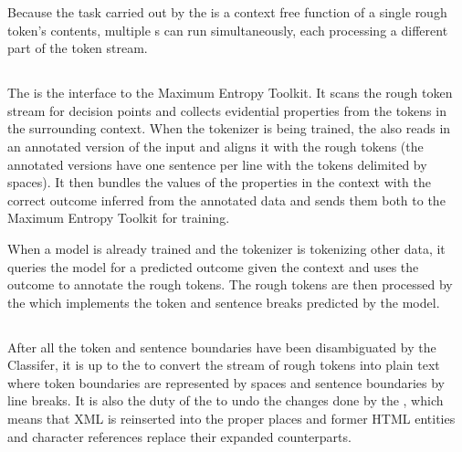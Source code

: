 Because the task carried out by the  is a context free
function of a single rough token's contents, multiple s
can run simultaneously, each processing a different part of the token stream.

\subsection{}
\label{ssec:impl-overview-classifier}

The  is the interface to the Maximum Entropy Toolkit. It
scans the rough token stream for decision points and collects evidential
properties from the tokens in the surrounding context. When the tokenizer is
being trained, the  also reads in an annotated version of the
input and aligns it with the rough tokens (the annotated versions have one
sentence per line with the tokens delimited by spaces). It then bundles the
values of the properties in the context with the correct outcome inferred from
the annotated data and sends them both to the Maximum Entropy Toolkit for
training.

When a model is already trained and the tokenizer is tokenizing other data, it
queries the model for a predicted outcome given the context and uses the
outcome to annotate the rough tokens. The rough tokens are then processed by
the  which implements the token and sentence breaks
predicted by the model.

\subsection{}
\label{ssec:impl-overview-outputformatter}

After all the token and sentence boundaries have been disambiguated by the
Classifer, it is up to the  to convert the stream of
rough tokens into plain text where token boundaries are represented by spaces
and sentence boundaries by line breaks. It is also the duty of the
 to undo the changes done by the ,
which means that XML is reinserted into the proper places and former HTML
entities and character references replace their expanded counterparts.

\subsection{}
\label{ssec:impl-overview-encoder}

